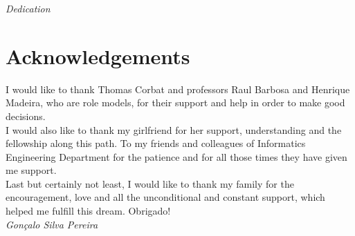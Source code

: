 
\pagestyle{empty}
\begin{center}

\emph{Dedication}

\end{center}

\clearpage
\section*{Acknowledgements}

I would like to thank Thomas Corbat and professors Raul Barbosa and Henrique Madeira, who are role models, for their support and help in order to make good decisions.\\

I would also like to thank my girlfriend for her support, understanding and the fellowship along this path. To my friends and colleagues of Informatics Engineering Department for the patience and for all those times they have given me support. \\

Last but certainly not least, I would like to thank my family for the encouragement, love and all the unconditional and constant support, which helped me fulfill this dream. Obrigado!\\



\emph{\hfill Gonçalo Silva Pereira}

\clearpage

\vspace*{\fill}
\pagestyle{empty}


